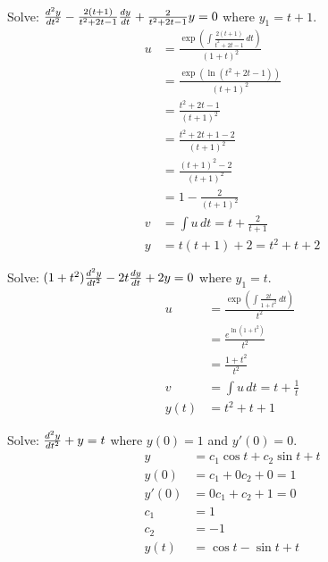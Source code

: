 \documentclass[12pt]{article}
\begin{document}
\begin{example} Solve: $\frac{d^2y}{dt^2} - \frac{2(t + 1)}{t^2 + 2t - 1}\frac{dy}{dt}+ \frac{2}{t^2 + 2t - 1}y = 0$ where $y_1 = t + 1$. 
$$ \begin{aligned} u &= \frac{\exp(\int \frac{2(t + 1)}{t^2 + 2t - 1} \, dt)}{(1 + t)^2} \\ &= \frac{\exp(\ln (t^2 + 2t - 1))}{(t + 1)^2} \\ &= \frac{t^2 + 2t - 1}{(t + 1)^2} \\ &= \frac{t^2 + 2t + 1 - 2}{(t + 1)^2} \\ &= \frac{(t + 1)^2 - 2}{(t + 1)^2} \\ &= 1 - \frac{2}{(t + 1)^2} \\ v &= \int u \, dt = t + \frac{2}{t + 1} \\ y &= t(t + 1) + 2 = t^2 + t + 2 \end{aligned} $$ \end{example}

\begin{example} Solve: $(1 + t^2)\frac{d^2y}{dt^2} - 2t\frac{dy}{dt}+ 2y = 0$ where $y_1 = t$. $$\begin{aligned} 
u &= \frac{\exp(\int \frac{2t}{1 + t^2} \, dt)}{t^2} \\ &= \frac{e^{\ln (1 + t^2)}}{t^2} \\ &= \frac{1 + t^2}{t^2} \\ v &= \int u \, dt = t + \frac{1}{t} \\ y(t) &= t^2 + t + 1 \end{aligned} $$ \end{example} 

\begin{example} Solve: $\frac{d^2y}{dt^2} + y = t$ where $y(0) = 1$ and $y'(0) = 0$. $$\begin{aligned} 
y &= c_1\cos t + c_2\sin t + t \\ y(0) &= c_1 + 0c_2 + 0 = 1 \\ y'(0) &= 0c_1 + c_2 + 1 = 0 \\ c_1 &= 1 \\ c_2 &= -1 \\ y(t) &= \cos t - \sin t + t \end{aligned} $$ \end{example}
\end{document}
